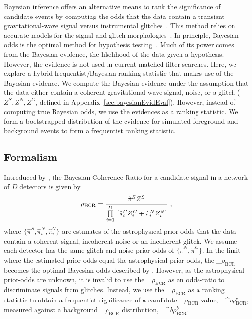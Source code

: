 \documentclass[
 nofootinbib,
 amsmath,amssymb,
 aps,
 twocolumn,
 superscriptaddress
]{revtex4-2}
\newcommand{\mathcmd}[1]{{\sc \relax\ifmmode#1\else $#1$\fi}\xspace}
\newcommand{\bcr}{\mathcmd{\rho_\text{BCR}}}
\newcommand{\bgrdbcr}{\mathcmd{\rho_\text{BCR}^\textit{b}}}
\newcommand{\candbcr}{\mathcmd{\rho_\text{BCR}^\textit{c}}}
\begin{document}
Bayesian inference offers an alternative means to rank the significance of candidate events by computing the odds that the data contain a transient gravitational-wave signal versus instrumental glitches~\cite{BCR1}. This method relies on accurate models for the signal and glitch morphologies~\cite{BCR1}. In principle, Bayesian odds is the optimal method for hypothesis testing~\cite{BCR2}. Much of its power comes from the Bayesian evidence, the likelihood of the data given a hypothesis. However, the evidence is not used in current matched filter searches. Here, we explore a hybrid frequentist/Bayesian ranking statistic that makes use of the Bayesian evidence. We compute the Bayesian evidence under the assumption that the data either contain a coherent gravitational-wave signal, noise, or a glitch ($Z^S, Z^N, Z^G$, defined in Appendix~\ref{sec:bayesianEvidEval}). However, instead of computing true Bayesian odds, we use the evidences as a ranking statistic. We form a bootstrapped distribution of the evidence for simulated foreground and background events to form a frequentist ranking statistic.

\subsection{Formalism}

Introduced by \citet{BCR1}, the Bayesian Coherence Ratio for a candidate signal in a network of $D$ detectors is given by
\begin{equation}
\label{eq:bcr}
\bcr = \frac{\hat{\pi}^S Z^S}{\prod\limits^D_{i=1} \ [\hat{\pi}^G_i Z^G_i + \hat{\pi}^N_i Z^N_i]}\  ,
\end{equation}
where $\{\hat{\pi}^S, \hat{\pi}^N_i, \hat{\pi}^G_i\}$ are estimates of the astrophysical prior-odds that the data contain a coherent signal, incoherent noise or an incoherent glitch. We assume each detector has the same glitch and noise prior odds of $\{\hat{\pi}^N, \hat{\pi}^G\}$. In the limit where the estimated prior-odds equal the astrophysical prior-odds, the \bcr becomes the optimal Bayesian odds described by \citet{BCR2}.  However, as the astrophysical prior-odds are unknown, it is invalid to use the \bcr as an odds-ratio to discriminate signals from glitches. Instead, we use the \bcr as a ranking statistic to obtain a frequentist significance of a candidate \bcr-value, \candbcr, measured against a background \bcr distribution, \bgrdbcr. 

\end{document}
